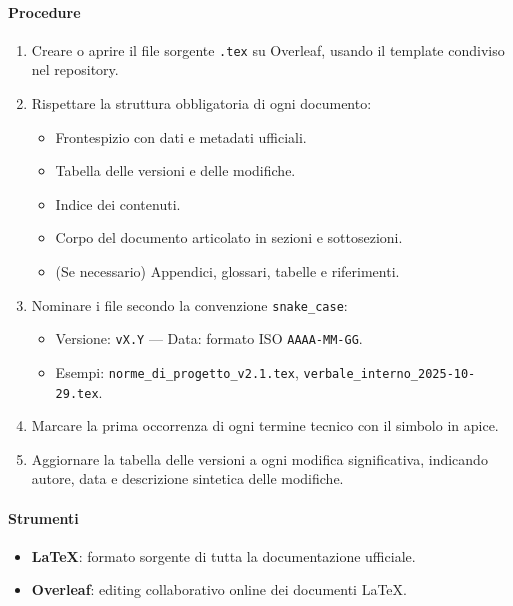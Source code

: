 \documentclass[a4paper, 11pt, oneside]{scrartcl}
\begin{document}
\paragraph{Procedure}
\begin{enumerate}
    \item Creare o aprire il file sorgente \texttt{.tex} su Overleaf{\scriptsize{}}, usando il template condiviso nel repository.
    \item Rispettare la struttura obbligatoria di ogni documento:
          \begin{itemize}
              \item Frontespizio{\scriptsize{}} con dati e metadati ufficiali.
              \item Tabella delle versioni e delle modifiche.
              \item Indice dei contenuti.
              \item Corpo del documento articolato in sezioni e sottosezioni.
              \item (Se necessario) Appendici, glossari, tabelle e riferimenti.
          \end{itemize}
    \item Nominare i file secondo la convenzione \texttt{snake\_case}{\scriptsize{}}:
          \begin{itemize}
              \item Versione: \texttt{vX.Y} — Data: formato ISO \texttt{AAAA-MM-GG}.
              \item Esempi: \texttt{norme\_di\_progetto\_v2.1.tex}, \texttt{verbale\_interno\_2025-10-29.tex}.
          \end{itemize}
    \item Marcare la prima occorrenza di ogni termine tecnico con il simbolo {\scriptsize{}} in apice.
    \item Aggiornare la tabella delle versioni a ogni modifica significativa, indicando autore, data e descrizione sintetica delle modifiche.
\end{enumerate}

\paragraph{Strumenti}
\begin{itemize}
    \item \textbf{\LaTeX{}}: formato sorgente di tutta la documentazione ufficiale.
    \item \textbf{Overleaf}: editing collaborativo online dei documenti \LaTeX{}.
\end{itemize}
\end{document}
